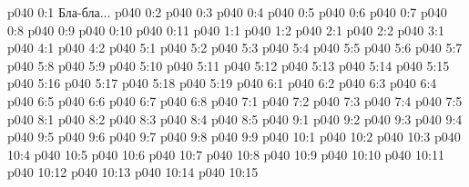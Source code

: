 \author{Могущественный Посланник}
\vs p040 0:1  Бла-бла...
\vs p040 0:2 
\vs p040 0:3 
\vs p040 0:4 
\vs p040 0:5 
\vs p040 0:6 
\vs p040 0:7 
\vs p040 0:8 
\vs p040 0:9 \pc 
\vs p040 0:10 
\vs p040 0:11 
\vs p040 1:1 
\vs p040 1:2 
\vs p040 2:1 
\vs p040 2:2 
\vs p040 3:1 
\vs p040 4:1 
\vs p040 4:2 
\vs p040 5:1 
\vs p040 5:2 
\vs p040 5:3 
\vs p040 5:4 \pc 
\vs p040 5:5 
\vs p040 5:6 
\vs p040 5:7 
\vs p040 5:8 \pc 
\vs p040 5:9 
\vs p040 5:10 
\vs p040 5:11 \pc 
\vs p040 5:12 \pc 
\vs p040 5:13 
\vs p040 5:14 
\vs p040 5:15 
\vs p040 5:16 
\vs p040 5:17 \pc 
\vs p040 5:18 \pc 
\vs p040 5:19 \pc 
{}
\vs p040 6:1 
\vs p040 6:2 
\vs p040 6:3 
\vs p040 6:4 
\vs p040 6:5 
\vs p040 6:6 
\vs p040 6:7 
\vs p040 6:8 
\vs p040 7:1 
\vs p040 7:2 
\vs p040 7:3 
\vs p040 7:4 
\vs p040 7:5 
\vs p040 8:1 
\vs p040 8:2 
\vs p040 8:3 
\vs p040 8:4 \pc 
\vs p040 8:5 
\vs p040 9:1 
\vs p040 9:2 \pc 
\vs p040 9:3 
\vs p040 9:4 \pc 
\vs p040 9:5 
\vs p040 9:6 
\vs p040 9:7 
\vs p040 9:8 \pc 
\vs p040 9:9 \pc 
{}
\vs p040 10:1 
\vs p040 10:2 
\vs p040 10:3 \pc 
\vs p040 10:4 
\vs p040 10:5 \pc 
\vs p040 10:6 \pc 
\vs p040 10:7 
\vs p040 10:8 \pc 
\vs p040 10:9 \pc 
\vs p040 10:10 
\vs p040 10:11 
\vs p040 10:12 
\vs p040 10:13 \pc 
\vs p040 10:14 
\vsetoff
\vs p040 10:15 
\quizlink
